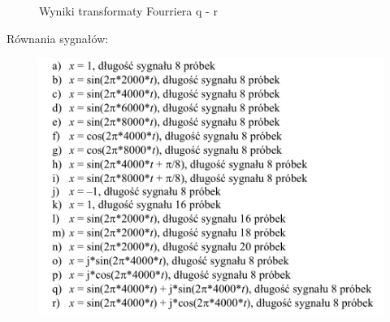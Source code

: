\documentclass[12pt,titlepage]{report}
\begin{document}
\begin{figure}
	\centering
	\caption{Wyniki transformaty Fourriera q - r}
\end{figure}

Równania sygnałów:
\begin{figure}[!h]
	\includegraphics[scale=0.9]{../cw31_polecenie}
\end{figure}
\end{document}
